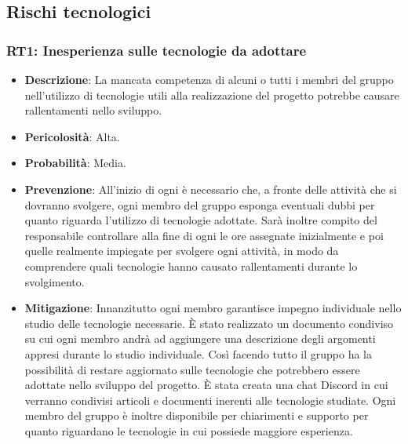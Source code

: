 \subsection{Rischi tecnologici}

\subsubsection{RT1: Inesperienza sulle tecnologie da adottare}
\label{rischio:RT1}
\begin{itemize}
    \item \textbf{Descrizione}: La mancata competenza di alcuni o tutti i membri del gruppo nell'utilizzo di tecnologie utili alla realizzazione del progetto potrebbe causare rallentamenti nello sviluppo.
    \item \textbf{Pericolosità}: Alta.
    \item \textbf{Probabilità}: Media.
    \item \textbf{Prevenzione}: All'inizio di ogni  è necessario che, a fronte delle attività che si dovranno svolgere, ogni membro del gruppo esponga eventuali dubbi per quanto riguarda l'utilizzo di tecnologie adottate. 
    Sarà inoltre compito del responsabile controllare alla fine di ogni  le ore assegnate inizialmente e poi quelle realmente impiegate per svolgere ogni attività, in modo da comprendere quali tecnologie hanno causato rallentamenti durante lo svolgimento.
    \item \textbf{Mitigazione}:  Innanzitutto ogni membro garantisce impegno individuale nello studio delle tecnologie necessarie.
    È stato realizzato un documento condiviso su cui ogni membro andrà ad aggiungere una descrizione degli argomenti appresi durante lo studio individuale.
    Così facendo tutto il gruppo ha la possibilità di restare aggiornato sulle tecnologie che potrebbero essere adottate nello sviluppo del progetto.
    È stata creata una chat Discord in cui verranno condivisi articoli e documenti inerenti alle tecnologie studiate.
    Ogni membro del gruppo è inoltre disponibile per chiarimenti e supporto per quanto riguardano le tecnologie in cui possiede maggiore esperienza.
\end{itemize}

